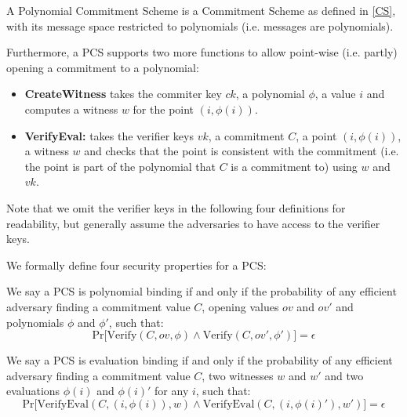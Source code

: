 \begin{definition}
    \label{PCS_def}
    A Polynomial Commitment Scheme is a Commitment Scheme as defined in \ref*{CS}, with its message space restricted to polynomials (i.e. messages are polynomials). 
    
    Furthermore, a PCS supports two more functions to allow point-wise (i.e. partly) opening a commitment to a polynomial: 
    \begin{itemize}
        \item \textbf{CreateWitness}
        takes the commiter key $ck$, a polynomial $\phi$, a value $i$ and computes a witness $w$ for the point $(i, \phi(i))$. 
        \item \textbf{VerifyEval:} 
        takes the verifier keys $vk$, a commitment $C$, a point $(i, \phi(i))$, a witness $w$ and checks that the point is consistent with the commitment (i.e. the point is part of the polynomial that $C$ is a commitment to) using $w$ and $vk$.
    \end{itemize}
\end{definition}

Note that we omit the verifier keys in the following four definitions for readability, but generally assume the adversaries to have access to the verifier keys. 

We formally define four security properties for a PCS:

\begin{definition}
    We say a PCS is polynomial binding if and only if the probability of any efficient adversary finding a commitment value $C$, opening values $ov$ and $ov'$ and polynomials $\phi$ and $\phi'$, such that:
    \begin{equation*}
        \text{Pr}\big[
            \text{Verify}(C,ov,\phi) \land \text{Verify}(C,ov',\phi')
        \big]
        = \epsilon
    \end{equation*}
    \parencite{KZG}
\end{definition}

\begin{definition}
    We say a PCS is evaluation binding if and only if the probability of any efficient adversary finding a commitment value $C$, two witnesses $w$ and $w'$ and two evaluations $\phi(i)$ and $\phi(i)'$ for any $i$, such that:
    \begin{equation*}
        \text{Pr}\big[
            \text{VerifyEval}(C,(i,\phi(i)), w) \land \text{VerifyEval}(C,(i,\phi(i)'), w')
        \big]
        = \epsilon
    \end{equation*}
    \parencite{KZG}
\end{definition}

